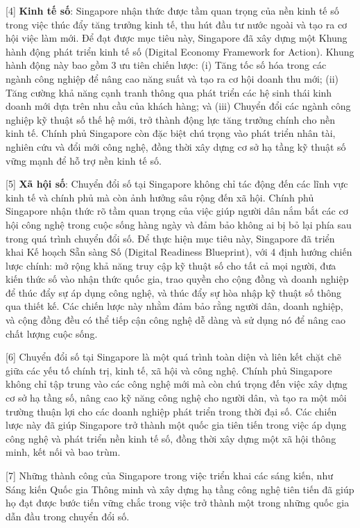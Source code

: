 \documentclass[12pt,a4paper,twoside]{article}
\newenvironment{readingpassage}[1][]{%
    \begin{tcolorbox}[enhanced, colback=grayLight, colframe=secondaryBlue,
        coltitle=textDark, fonttitle=\bfseries, title={#1},
        rounded corners, arc=3mm, boxrule=1pt,
        left=15pt, right=15pt, top=10pt, bottom=10pt,
        breakable, before skip=10pt, after skip=10pt, drop fuzzy shadow]
    \setstretch{1.3}
}{\end{tcolorbox}}
\begin{document}
\begin{readingpassage}[]
[4] \textbf{Kinh tế số}: Singapore nhận thức được tầm quan trọng của nền kinh tế số trong việc thúc đẩy tăng trưởng kinh tế, thu hút đầu tư nước ngoài và tạo ra cơ hội việc làm mới. Để đạt được mục tiêu này, Singapore đã xây dựng một Khung hành động phát triển kinh tế số (Digital Economy Framework for Action). Khung hành động này bao gồm 3 ưu tiên chiến lược: (i) Tăng tốc số hóa trong các ngành công nghiệp để nâng cao năng suất và tạo ra cơ hội doanh thu mới; (ii) Tăng cường khả năng cạnh tranh thông qua phát triển các hệ sinh thái kinh doanh mới dựa trên nhu cầu của khách hàng; và (iii) Chuyển đổi các ngành công nghiệp kỹ thuật số thế hệ mới, trở thành động lực tăng trưởng chính cho nền kinh tế. Chính phủ Singapore còn đặc biệt chú trọng vào phát triển nhân tài, nghiên cứu và đổi mới công nghệ, đồng thời xây dựng cơ sở hạ tầng kỹ thuật số vững mạnh để hỗ trợ nền kinh tế số.

[5] \textbf{Xã hội số}: Chuyển đổi số tại Singapore không chỉ tác động đến các lĩnh vực kinh tế và chính phủ mà còn ảnh hưởng sâu rộng đến xã hội. Chính phủ Singapore nhận thức rõ tầm quan trọng của việc giúp người dân nắm bắt các cơ hội công nghệ trong cuộc sống hàng ngày và đảm bảo không ai bị bỏ lại phía sau trong quá trình chuyển đổi số. Để thực hiện mục tiêu này, Singapore đã triển khai Kế hoạch Sẵn sàng Số (Digital Readiness Blueprint), với 4 định hướng chiến lược chính: mở rộng khả năng truy cập kỹ thuật số cho tất cả mọi người, đưa kiến thức số vào nhận thức quốc gia, trao quyền cho cộng đồng và doanh nghiệp để thúc đẩy sự áp dụng công nghệ, và thúc đẩy sự hòa nhập kỹ thuật số thông qua thiết kế. Các chiến lược này nhằm đảm bảo rằng người dân, doanh nghiệp, và cộng đồng đều có thể tiếp cận công nghệ dễ dàng và sử dụng nó để nâng cao chất lượng cuộc sống.

[6] Chuyển đổi số tại Singapore là một quá trình toàn diện và liên kết chặt chẽ giữa các yếu tố chính trị, kinh tế, xã hội và công nghệ. Chính phủ Singapore không chỉ tập trung vào các công nghệ mới mà còn chú trọng đến việc xây dựng cơ sở hạ tầng số, nâng cao kỹ năng công nghệ cho người dân, và tạo ra một môi trường thuận lợi cho các doanh nghiệp phát triển trong thời đại số. Các chiến lược này đã giúp Singapore trở thành một quốc gia tiên tiến trong việc áp dụng công nghệ và phát triển nền kinh tế số, đồng thời xây dựng một xã hội thông minh, kết nối và bao trùm.

[7] Những thành công của Singapore trong việc triển khai các sáng kiến, như Sáng kiến Quốc gia Thông minh và xây dựng hạ tầng công nghệ tiên tiến đã giúp họ đạt được bước tiến vững chắc trong việc trở thành một trong những quốc gia dẫn đầu trong chuyển đổi số.


\end{readingpassage}
\end{document}
